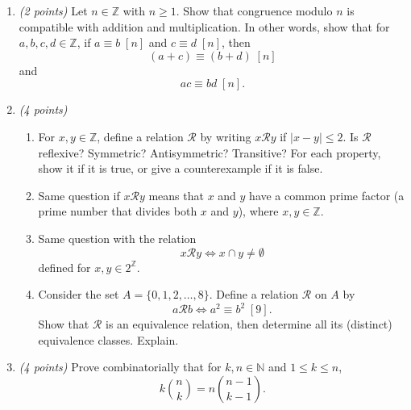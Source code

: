 \documentclass[12pt]{article}
\begin{document}
\begin{enumerate}[itemsep=1.2em]

\item \emph{(2 points)} Let \( n \in \mathbb{Z} \) with \( n \geq 1 \). Show that congruence modulo \( n \) is compatible with addition and multiplication. In other words, show that for \( a, b, c, d \in \mathbb{Z} \), if \( a \equiv b \; [n] \) and \( c \equiv d \; [n] \), then
\[
(a+c) \equiv (b+d) \; [n]
\]
and
\[
ac \equiv bd \; [n].
\]\newline

\item \emph{(4 points)}

\begin{enumerate}
    \item For \( x, y \in \mathbb{Z} \), define a relation \( \mathcal{R} \) by writing \( x \mathcal{R} y \) if \( |x - y| \leq 2 \). Is \( \mathcal{R} \) reflexive? Symmetric? Antisymmetric? Transitive? For each property, show it if it is true, or give a counterexample if it is false.\newline
    
    \item Same question if \( x \mathcal{R} y \) means that \( x \) and \( y \) have a common prime factor (a prime number that divides both \( x \) and \( y \)), where \( x, y \in \mathbb{Z} \).\newline
    
    \item Same question with the relation
    \[
    x \mathcal{R} y \iff x \cap y \neq \emptyset
    \]
    defined for \( x, y \in 2^{\mathbb{Z}} \).\newline
    
    \item Consider the set \( A = \{0, 1, 2, \dots, 8 \} \). Define a relation \( \mathcal{R} \) on \( A \) by
    \[
    a \mathcal{R} b \iff a^2 \equiv b^2 \; [9].
    \]
    Show that \( \mathcal{R} \) is an equivalence relation, then determine all its (distinct) equivalence classes. Explain. \newline
    
\end{enumerate}

\item \emph{(4 points)} Prove combinatorially that for \( k, n \in \mathbb{N} \) and \( 1 \leq k \leq n \),
\[
k \binom{n}{k} = n \binom{n-1}{k-1}.
\] \newline


\end{enumerate}
\end{document}
